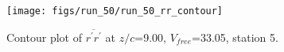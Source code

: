 \begin{figure}[H]
\centering
\texttt{[image: figs/run\_50/run\_50\_rr\_contour]}
\caption{Contour plot of $\overline{r^\prime r^\prime}$ at $z/c$=9.00, $V_{free}$=33.05, station 5.}
\end{figure}


